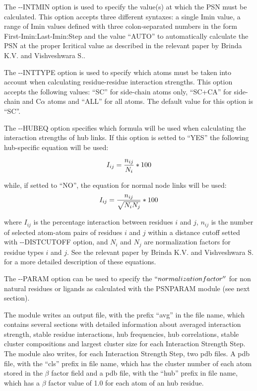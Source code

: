 \documentclass[11pt,twoside,onecolumn,a4paper,openright,notitlepage]{book}[2001/04/21]
\begin{document}
The -{}-INTMIN option is used to specify the value(s) at which the PSN must be calculated.
This option accepts three different syntaxes: a single Imin value, a range of Imin values defined with three colon-separated numbers in the form First-Imin:Last-Imin:Step and 
the value ``AUTO'' to automatically calculate the PSN at the proper Icritical value as described in the relevant paper by Brinda K.V. and Vishveshwara S.\cite{brinda05}.

The -{}-INTTYPE option is used to specify which atoms must be taken into account when calculating residue-residue interaction strengths.
This option accepts the following values: ``SC'' for side-chain atoms only, ``SC+CA'' for side-chain and C$\alpha{}$ atoms and ``ALL'' for all atoms. The default value for this option is ``SC''.

The -{}-HUBEQ option specifies which formula will be used when calculating the interaction strengths of hub links.
If this option is setted to ``YES'' the following hub-specific equation will be used:

\begin{equation}
I_{ij} = \frac{n_{ij}}{N_{i}}*100\\
\end{equation}

while, if setted to ``NO'', the equation for normal node links will be used:\\

\begin{equation}
I_{ij} = \frac{n_{ij}}{\sqrt{N_{i} N_{j}}}*100\\
\end{equation}

where $I_{ij}$ is the percentage interaction between residues $i$ and $j$, $n_{ij}$ is the number of selected atom-atom pairs of residues $i$ and $j$ within a distance cutoff setted with -{}-DISTCUTOFF option,
and $N_{i}$ and $N_{j}$ are normalization factors for residue types $i$ and $j$. See the relevant paper by Brinda K.V. and Vishveshwara S.\cite{brinda05} for a more detailed description of these equations.

The -{}-PARAM option can be used to specify the $``normalization factor''$ for non natural residues or ligands as calculated with the PSNPARAM module (see next section).

The module writes an output file, with the prefix ``avg'' in the file name, which contains several sections with detailed information about averaged
interaction strength, stable residue interactions, hub frequencies, hub correlations, stable cluster compositions and largest cluster size for each
Interaction Strength Step. The module also writes, for each Interaction Strength Step, two pdb files. A pdb file, with the ``cls'' prefix in file name,
which has the cluster number of each atom stored in the $\beta{}$ factor field and a pdb file, with the ``hub'' prefix in file name, which has a $\beta{}$
factor value of 1.0 for each atom of an hub residue.
\end{document}
